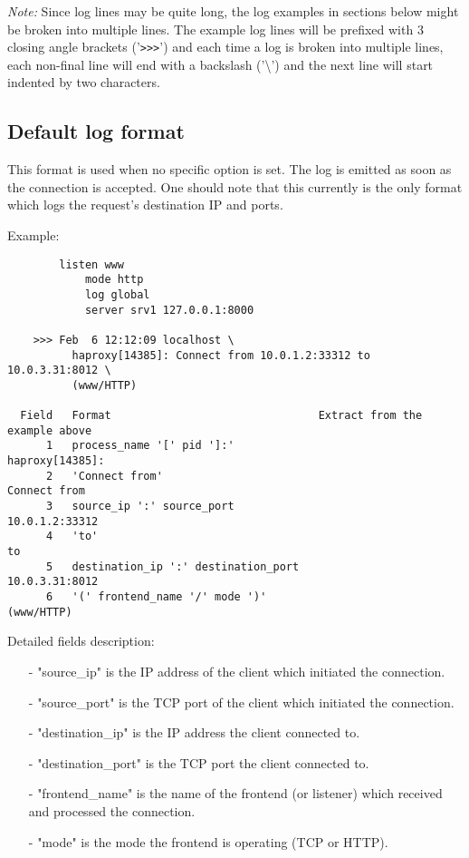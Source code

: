 \emph{Note:} Since log lines may be quite long, the log examples in sections below
       might be broken into multiple lines. The example log lines will be
       prefixed with 3 closing angle brackets ('\verb|>>>|') and each time a log is
       broken into multiple lines, each non-final line will end with a
       backslash ('\textbackslash') and the next line will start indented by two characters.


\subsection{Default log format}

This format is used when no specific option is set. The log is emitted as soon
as the connection is accepted. One should note that this currently is the only
format which logs the request's destination IP and ports.

  Example:
\begin{verbatim}
        listen www
            mode http
            log global
            server srv1 127.0.0.1:8000

    >>> Feb  6 12:12:09 localhost \
          haproxy[14385]: Connect from 10.0.1.2:33312 to 10.0.3.31:8012 \
          (www/HTTP)

  Field   Format                                Extract from the example above
      1   process_name '[' pid ']:'                            haproxy[14385]:
      2   'Connect from'                                          Connect from
      3   source_ip ':' source_port                             10.0.1.2:33312
      4   'to'                                                              to
      5   destination_ip ':' destination_port                   10.0.3.31:8012
      6   '(' frontend_name '/' mode ')'                            (www/HTTP)
\end{verbatim}

Detailed fields description:

\begin{itemize}
\item[-] "source\_ip" is the IP address of the client which initiated the connection.
\item[-] "source\_port" is the TCP port of the client which initiated the connection.
\item[-] "destination\_ip" is the IP address the client connected to.
\item[-] "destination\_port" is the TCP port the client connected to.
\item[-] "frontend\_name" is the name of the frontend (or listener) which received
    and processed the connection.
\item[-] "mode" is the mode the frontend is operating (TCP or HTTP).
\end{itemize}

